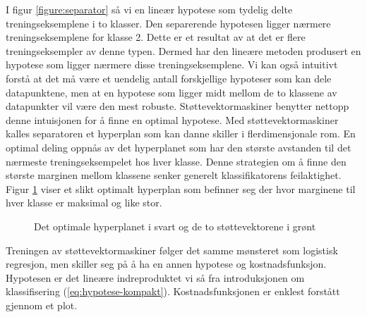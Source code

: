I figur \ref{figure:separator} så vi en lineær hypotese som tydelig delte treningseksemplene i to klasser. Den separerende hypotesen ligger nærmere treningseksemplene for klasse 2. Dette er et resultat av at det er flere treningseksempler av denne typen. Dermed har den lineære metoden produsert en hypotese som ligger nærmere disse treningseksemplene. Vi kan også intuitivt forstå at det må være et uendelig antall forskjellige hypoteser som kan dele datapunktene, men at en hypotese som ligger midt mellom de to klassene av datapunkter vil være den mest robuste. Støttevektormaskiner benytter nettopp denne intuisjonen for å finne en optimal hypotese. Med støttevektormaskiner kalles separatoren et hyperplan som kan danne skiller i flerdimensjonale rom. En optimal deling oppnås av det hyperplanet som har den største avstanden til det nærmeste treningseksempelet hos hver klasse. Denne strategien om å finne den største marginen mellom klassene senker generelt klassifikatorens feilaktighet. Figur \ref{figure:svm} viser et slikt optimalt hyperplan som befinner seg der hvor marginene til hver klasse er maksimal og like stor.
\begin{figure}[h!]
\centering
{}
\caption{Det optimale hyperplanet i svart og de to støttevektorene i grønt}
\label{figure:svm}
\end{figure}
Treningen av støttevektormaskiner følger det samme mønsteret som logistisk regresjon, men skiller seg på å ha en annen hypotese og kostnadsfunksjon. Hypotesen er det lineære indreproduktet vi så fra introduksjonen om klassifisering (\ref{eq:hypotese-kompakt}). Kostnadsfunksjonen er enklest forstått gjennom et plot.
